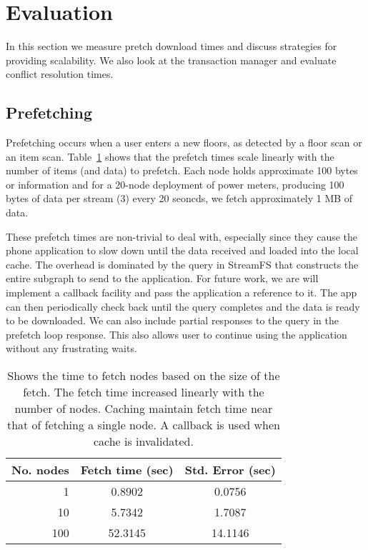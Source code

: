 \section{Evaluation}
\label{sec:eval}
In this section we measure pretch download times and discuss strategies for providing scalability.  We also
look at the transaction manager and evaluate conflict resolution times.



\subsection{Prefetching}
Prefetching occurs when a user enters a new floors, as detected by a floor scan or an item
scan.  Table~\ref{tab:prefetchtimes} shows that the prefetch times scale linearly with the number of
items (and data) to prefetch.  Each node holds approximate 100 bytes or information and for
a 20-node deployment of power meters, producing 100 bytes of data per stream (3) every 20 seoncds, we fetch 
approximately 1 MB of data.

These prefetch times are non-trivial to deal with, especially since they cause the phone application to slow down
until the data received and loaded into the local cache.  The overhead is dominated by the query in StreamFS that 
constructs the entire subgraph to send to the application.  For future work,  we are will implement a
callback facility and pass the application a reference to it.  The app can then periodically check back until
the query completes and the data is ready to be downloaded.  We can also include partial responses to the query
in the prefetch loop response.  This also allows user to continue using the application without any frustrating waits.

\begin{table}
\begin{center}
  \begin{tabular}{| r | c  c | }
    \hline
    {\bf No. nodes } & {\bf Fetch time (sec) } & {\bf Std. Error (sec)} \\ \hline
    1 & 0.8902 & 0.0756 \\ \hline
    10 & 5.7342 & 1.7087 \\ \hline
    100 & 52.3145 & 14.1146 \\ 
    \hline
  \end{tabular}
\caption{Shows the time to fetch nodes based on the size of the fetch.  The fetch time
increased linearly with the number of nodes.  Caching maintain fetch time near
that of fetching a single node.  A callback is used when cache is invalidated.}
\label{tab:prefetchtimes}
\end{center}
\end{table}


